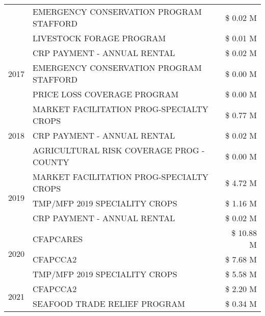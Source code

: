 \begin{tabular}{llr}
 & EMERGENCY CONSERVATION PROGRAM STAFFORD & \$ 0.02 M \\
 & LIVESTOCK FORAGE PROGRAM & \$ 0.01 M \\
\cline{1-3}
\multirow[t]{3}{*}{2017} & CRP PAYMENT - ANNUAL RENTAL & \$ 0.02 M \\
 & EMERGENCY CONSERVATION PROGRAM STAFFORD & \$ 0.00 M \\
 & PRICE LOSS COVERAGE PROGRAM & \$ 0.00 M \\
\cline{1-3}
\multirow[t]{3}{*}{2018} & MARKET FACILITATION PROG-SPECIALTY CROPS & \$ 0.77 M \\
 & CRP PAYMENT - ANNUAL RENTAL & \$ 0.02 M \\
 & AGRICULTURAL RISK COVERAGE PROG - COUNTY & \$ 0.00 M \\
\cline{1-3}
\multirow[t]{3}{*}{2019} & MARKET FACILITATION PROG-SPECIALTY CROPS & \$ 4.72 M \\
 & TMP/MFP 2019 SPECIALITY CROPS & \$ 1.16 M \\
 & CRP PAYMENT - ANNUAL RENTAL & \$ 0.02 M \\
\cline{1-3}
\multirow[t]{3}{*}{2020} & CFAPCARES & \$ 10.88 M \\
 & CFAPCCA2 & \$ 7.68 M \\
 & TMP/MFP 2019 SPECIALITY CROPS & \$ 5.58 M \\
\cline{1-3}
\multirow[t]{2}{*}{2021} & CFAPCCA2 & \$ 2.20 M \\
 & SEAFOOD TRADE RELIEF PROGRAM & \$ 0.34 M \\
\cline{1-3}
\bottomrule
\end{tabular}
